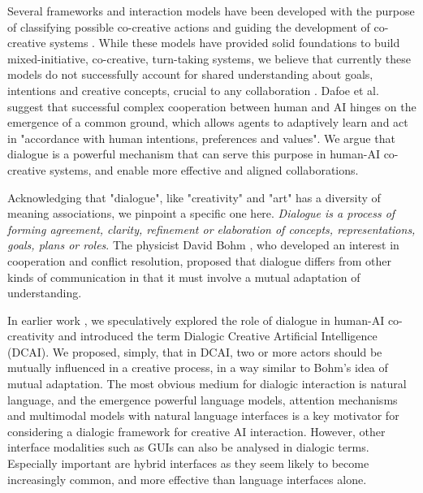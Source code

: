 \documentclass[acmlarge, nonacm, screen]{acmart} %
\begin{document}
Several frameworks and interaction models have been developed with the purpose of classifying possible co-creative actions and guiding the development of co-creative systems \cite{Rezwana_undated-dr, mullermixed, spoto17}. While these models have provided solid foundations to build mixed-initiative, co-creative, turn-taking systems, we believe that currently these models do not successfully account for shared understanding about goals, intentions and creative concepts, crucial to any collaboration \cite{Dafoe2021-in,Hoc2000-iy}. %
Dafoe et al. \cite{Dafoe2021-in} suggest that successful complex cooperation between human and AI hinges on the emergence of a common ground, which allows agents to adaptively learn and act in "accordance with human intentions, preferences and values". We argue that dialogue is a powerful mechanism that can serve this purpose in human-AI co-creative systems, and enable more effective and aligned collaborations.

Acknowledging that "dialogue", like "creativity" and "art" has a diversity of meaning associations, we pinpoint a specific one here. \emph{Dialogue is a process of forming agreement, clarity, refinement or elaboration of concepts, representations, goals, plans or roles}. The physicist David Bohm \cite{bohm2004dialogue}, who developed an interest in cooperation and conflict resolution, proposed that dialogue differs from other kinds of communication in that it must involve a mutual adaptation of understanding. 

In earlier work \citep{bownspeculative2020}, we speculatively explored the role of dialogue in human-AI co-creativity and introduced the term Dialogic Creative Artificial Intelligence (DCAI). We proposed, simply, that in DCAI, two or more actors should be mutually influenced in a creative process, in a way similar to Bohm's idea of mutual adaptation. The most obvious medium for dialogic interaction is natural language, and the emergence powerful language models, attention mechanisms and multimodal models with natural language interfaces is a key motivator for considering a dialogic framework for creative AI interaction. However, other interface modalities such as GUIs can also be analysed in dialogic terms. Especially important are hybrid interfaces as they seem likely to become increasingly common, and more effective than language interfaces alone.
\end{document}
